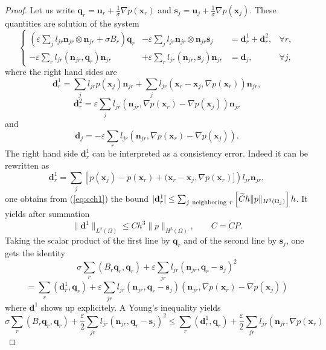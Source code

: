 \documentclass[a4paper,french,english,10pt]{article}
\newcommand\ljr{l_{jr}}
\newcommand\njr{\mathbf{n}_{jr}}
\newcommand\uu{\mathbf{u}}
\newcommand\eps{\varepsilon}
\newcommand\x{\mathbf{x}}
\begin{document}
\begin{proof}
Let us write $\mathbf q_r= \uu_r +\frac1\sigma \nabla p(\x _r)$
and $\mathbf s_j= \uu_j +\frac1\sigma \nabla p(\x _j)$.
These quantities are solution
of the system
$$
\left\{
\begin{array}{ccll}
 \left( \eps\sum_{j}l_{jr} \njr\otimes \njr  +  \sigma B_r\right) \mathbf q_r
& -
\eps \sum_{j}l_{jr} \njr\otimes \njr \mathbf s_j& =
\mathbf  d_r^1+\mathbf  d_r^2 , & \forall r,  \\
- \eps \sum_{r}l_{jr} (\njr, \mathbf q_r )\njr & +  
\eps  \sum_{r}l_{jr} (\njr, \mathbf s_j )\njr& =\mathbf  d_j,
&
 \forall j, 
\end{array}
\right.
$$
where the right hand sides are
$$
\mathbf  d_r^1=
\sum_{j}\ljr   p(\mathbf x_j)\njr+ \sum_j l_{jr}  (\x_r -\x_j, \nabla p(\x_r))\njr,
$$
$$
\mathbf  d_r^2=\eps\sum_j l_{jr}  \left( \njr, \nabla p(\x_r)
- \nabla p(\x_j) \right)
\njr    
$$
and
$$
\mathbf  d_j=-\eps\sum_r l_{jr}  \left( \njr, \nabla p(\x_r)
- \nabla p(\x_j) \right).
$$
The right hand side $ \mathbf d_r^1$   can be interpreted as a consistency error.
Indeed it  can be rewritten as
$$
\mathbf  d_r^1=
 \sum_{j} \left[     p(\mathbf x_j)- p(\mathbf x_r) + (\x_r -\x_j, \nabla p(\x_r) ] \right)\ljr \njr ,
$$
one obtains from (\ref{eq:cch1}) the bound 
$
| \mathbf  d_r^1 |\leq  \sum_{j \  {\rm neighboring } \ r} \left[ \widetilde C h \|  p \| _{H^3(\Omega_j)}   \right]h$. 
It yields after summation
\begin{equation} \label{eq:ddd1}
\| \mathbf d^1\|_{L^2(\Omega)} \leq C h^3 \|  p \| _{H^3(\Omega)} , \qquad C= \widetilde CP.
\end{equation}
Taking the scalar product of the first line by $\mathbf q_r$
and of the second line by   $\mathbf s_j$, one gets the identity
$$
\sigma \sum_r \left(B_r \mathbf q_r, \mathbf q_r    \right)
+ \eps \sum_{jr} l_{jr}
\left( \njr, \mathbf q_r - \mathbf s_j  \right)^2
$$
$$
=
\sum_r \left( \mathbf d_r^1, \mathbf q_r   \right)+  
\eps \sum_{jr} l_{jr}
\left( \njr, \mathbf q_r - \mathbf s_j  \right)
\left( \njr, 
 \nabla p(\x_r)
- \nabla p(\x_j)
 \right)
$$
where  $\mathbf d^1$ shows up explicitely. %
A Young's inequality yields
\begin{equation} \label{eq:y1}
\sigma \sum_r \left(B_r \mathbf q_r, \mathbf q_r    \right)
+\frac\eps2
 \sum_{jr} l_{jr}
\left( \njr, \mathbf q_r - \mathbf s_j  \right)^2\leq 
\sum_r \left( \mathbf d_r^1, \mathbf q_r   \right)+
 \frac\eps2  \sum_{jr} l_{jr}
\left( \njr, 
 \nabla p(\x_r)

\end{equation}
\end{proof}
\end{document}
